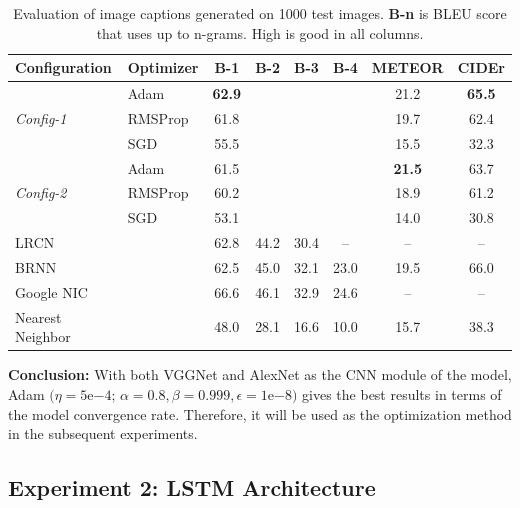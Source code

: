 \begin{itemize}
\begin{table}
	\centering
	\begin{tabular}{llcccccc}
		\toprule
		Configuration & Optimizer & B-1 & B-2 & B-3 & B-4 & METEOR & CIDEr \\ \midrule
		\multirow{3}{*}{\textit{Config-1}} & Adam & \textbf{62.9} & & & & 21.2 & \textbf{65.5} \\
		 & RMSProp & 61.8 & & & & 19.7 & 62.4 \\
		 & SGD & 55.5 & & & & 15.5 & 32.3 \\
		 \midrule
		 \multirow{3}{*}{\textit{Config-2}} & Adam & 61.5 & & & &\textbf{21.5} & 63.7 \\
		 & RMSProp & 60.2 & & & & 18.9 & 61.2 \\
		 & SGD & 53.1 & & & & 14.0 & 30.8 \\
		 \midrule
		 LRCN\cite{DBLP:journals/corr/DonahueHGRVSD14} &  & 62.8 & 44.2 & 30.4 & -- & -- & -- \\
		 BRNN\cite{DBLP:journals/corr/KarpathyF14} & & 62.5 & 45.0 & 32.1 & 23.0 & 19.5 & 66.0 \\
		 Google NIC \cite{DBLP:journals/corr/VinyalsTBE14} & & 66.6 & 46.1 & 32.9 & 24.6 & -- & -- \\
		 Nearest Neighbor \cite{DBLP:journals/corr/KarpathyF14} & & 48.0 & 28.1 & 16.6 & 10.0 & 15.7 & 38.3 \\ 
		 \bottomrule
	\end{tabular}
	\caption[Evaluation of image captions generated on $1000$ test images]{Evaluation of image captions generated on 1000 test images. \textbf{B-n} is BLEU score that uses up to n-grams. High is good in all columns. }
	\label{tab:exp1_coco_score}
\end{table}

\textbf{Conclusion:} With both VGGNet and AlexNet as the CNN module of the model, Adam $( \eta = 5\mathrm{e}{-4}$; $\alpha = 0.8, \beta = 0.999, \epsilon = 1\mathrm{e}{-8} )$ gives the best results in terms of the model convergence rate. Therefore, it will be used as the optimization method in the subsequent experiments.

\subsection{Experiment 2: LSTM Architecture}
\label{exp:lstm_architecture}

\end{itemize}
